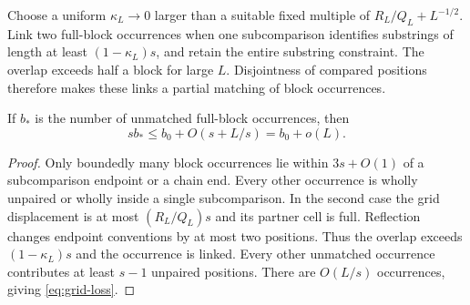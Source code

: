 Choose a uniform $\kappa_L\to0$ larger than a suitable fixed multiple of $R_L/Q_L+L^{-1/2}$. Link two full-block occurrences when one subcomparison identifies substrings of length at least $(1-\kappa_L)s$, and retain the entire substring constraint. The overlap exceeds half a block for large $L$. Disjointness of compared positions therefore makes these links a partial matching of block occurrences.
\begin{lemma}\label{lem:grid-loss}
If $b_*$ is the number of unmatched full-block occurrences, then
\begin{equation}\label{eq:grid-loss}
 sb_*\le b_0+O(s+L/s)=b_0+o(L).
\end{equation}
\end{lemma}
\begin{proof}
Only boundedly many block occurrences lie within $3s+O(1)$ of a subcomparison endpoint or a chain end. Every other occurrence is wholly unpaired or wholly inside a single subcomparison. In the second case the grid displacement is at most $(R_L/Q_L)s$ and its partner cell is full. Reflection changes endpoint conventions by at most two positions. Thus the overlap exceeds $(1-\kappa_L)s$ and the occurrence is linked. Every other unmatched occurrence contributes at least $s-1$ unpaired positions. There are $O(L/s)$ occurrences, giving \eqref{eq:grid-loss}.
\end{proof}

